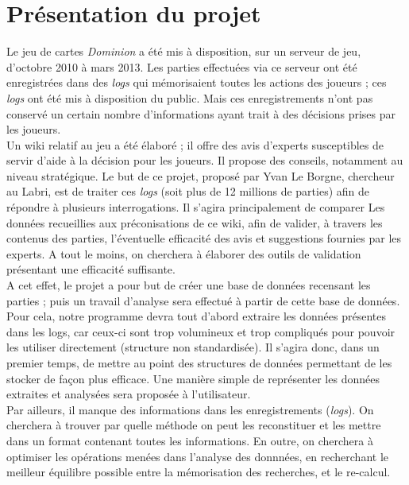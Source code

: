 \chapter{Présentation du projet}

Le jeu de cartes \textit{Dominion} a été mis à disposition, sur un serveur de jeu, d'octobre 2010 à mars 2013. Les parties effectuées via ce serveur ont été enregistrées dans des \textit{logs} qui mémorisaient toutes les actions des joueurs ; ces \textit{logs} ont été mis à disposition du public. Mais ces enregistrements n'ont pas conservé un certain nombre d'informations ayant trait à des décisions prises par les joueurs.\\

Un wiki relatif au jeu a été élaboré ; il offre des avis d'experts susceptibles de servir d'aide à la décision pour les joueurs. Il propose des conseils, notamment au niveau stratégique. Le but de ce projet, proposé par Yvan Le Borgne, chercheur au Labri, est de traiter ces \textit{logs} (soit plus de 12 millions de parties) afin de répondre à plusieurs interrogations. Il s'agira principalement de comparer Les données recueillies aux préconisations de ce wiki, afin de valider, à travers les contenus des parties, l'éventuelle efficacité des avis et suggestions fournies par les experts. A tout le moins, on cherchera à élaborer des outils de validation présentant une efficacité suffisante.\\
 
A cet effet, le projet a pour but de créer une base de données recensant les parties ; puis un travail d'analyse sera effectué à partir de cette base de données.
Pour cela, notre programme devra tout d'abord extraire les données présentes dans les logs, car ceux-ci sont trop volumineux et trop compliqués pour pouvoir les utiliser directement (structure non standardisée). Il s'agira donc, dans un premier temps, de mettre au point des structures de données permettant de les stocker de façon plus efficace. Une manière simple de représenter les données extraites et analysées sera proposée à l'utilisateur.\\

Par ailleurs, il manque des informations dans les enregistrements (\textit{logs}). On cherchera à trouver par quelle méthode on peut les reconstituer et les mettre dans un format contenant toutes les informations.
En outre, on cherchera à optimiser les opérations menées dans l'analyse des donnnées, en recherchant le meilleur équilibre possible entre la mémorisation des recherches, et le re-calcul.\\

